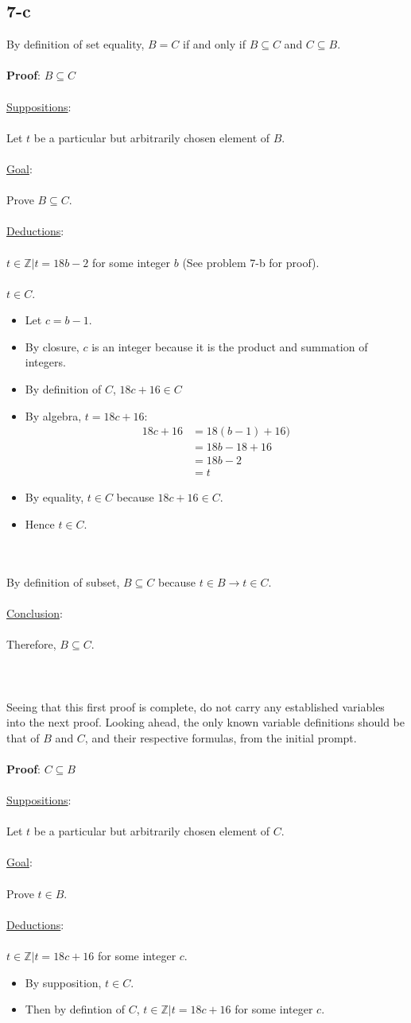 \documentclass[12pt]{article}
\newcommand{\xlist}[1]{
    \begin{itemize}
        \renewcommand{\labelitemi}{$\centerdot$}
        #1
    \end{itemize}
    \newblock
    \\ \\
}
\newcommand{\xsupposition}[1]{
    \underline{Suppositions}:
    \\ \\
    #1
    \\ \\
}
\newcommand{\xgoal}[1]{
    \underline{Goal}:
    \\ \\
    #1
    \\ \\
}
\newcommand{\xdeductions}{
    \underline{Deductions}:
    \\ \\
}
\newcommand{\xconclusion}[1]{
    \underline{Conclusion}:
    \\ \\
    #1
    \\ \\
}
\begin{document}
\subsection*{7-c}
By definition of set equality, $B = C$ if and only if $B \subseteq C$ and $C \subseteq B$.
\\ \\
\textbf{Proof}: $B \subseteq C$
\\ \\
\xsupposition {Let $t$ be a particular but arbitrarily chosen element of $B$.}
\xgoal{Prove $B \subseteq C$.}
\xdeductions
$t \in \mathbb{Z} | t = 18b - 2$ for some integer $b$ (See problem 7-b for proof).
\\ \\
$t \in C$.
\xlist{
    \item Let $c = b-1$.
    \item By closure, $c$ is an integer because it is the product and summation of integers.
    \item By definition of $C$, $18c + 16 \in C$
    \item By algebra, $t = 18c + 16$:
    \begin{align*}
        18c + 16 &= 18(b-1) + 16) \\
        &= 18b - 18 + 16 \\
        &= 18b - 2 \\
        &= t
    \end{align*}
    \item By equality, $t \in C$ because $18c + 16 \in C$.
    \item Hence $t \in C$.
}
By definition of subset, $B \subseteq C$ because $t \in B \rightarrow t \in C$.
\\ \\
\xconclusion{Therefore, $B \subseteq C$.}
\\ \\
Seeing that this first proof is complete, do not carry any established variables into the next proof. 
Looking ahead, the only known variable definitions should be that of $B$ and $C$, and their respective formulas, from the initial prompt.
\\ \\
\textbf{Proof}: $C \subseteq B$
\\ \\
\xsupposition {Let $t$ be a particular but arbitrarily chosen element of $C$.}
\xgoal{Prove $t \in B$.}
\xdeductions
$t \in \mathbb{Z} | t = 18c + 16$ for some integer $c$.
\xlist{
    \item By supposition, $t \in C$.
    \item Then by defintion of $C$, $t \in \mathbb{Z} | t = 18c + 16$ for some integer $c$.
}
\end{document}
